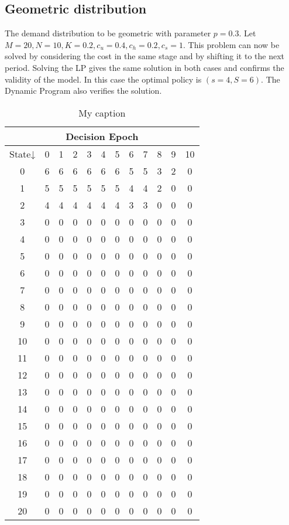 \documentclass[11pt,a4paper,oneside]{report}
\begin{document}
\subsection{Geometric distribution}
The demand distribution to be geometric with parameter $p=0.3$. Let $M = 20, N = 10, K=0.2, c_u=0.4, c_h=0.2, c_s=1$. This problem can now be solved by considering the cost in the same stage and by shifting it to the next period. Solving the LP gives the same solution in both cases and confirms the validity of the model. In this case the optimal policy is $(s=4, S=6)$. The Dynamic Program also verifies the solution.
\begin{table}[H]
\centering
\caption{My caption}
\label{my-label}
\begin{tabular}{|c|c|c|c|c|c|c|c|c|c|c|c|}
\hline
\multicolumn{12}{|c|}{Decision Epoch}               \\ \hline
State↓ & 0 & 1 & 2 & 3 & 4 & 5 & 6 & 7 & 8 & 9 & 10 \\ \hline
0      & 6 & 6 & 6 & 6 & 6 & 6 & 5 & 5 & 3 & 2 & 0  \\ \hline
1      & 5 & 5 & 5 & 5 & 5 & 5 & 4 & 4 & 2 & 0 & 0  \\ \hline
2      & 4 & 4 & 4 & 4 & 4 & 4 & 3 & 3 & 0 & 0 & 0  \\ \hline
3      & 0 & 0 & 0 & 0 & 0 & 0 & 0 & 0 & 0 & 0 & 0  \\ \hline
4      & 0 & 0 & 0 & 0 & 0 & 0 & 0 & 0 & 0 & 0 & 0  \\ \hline
5      & 0 & 0 & 0 & 0 & 0 & 0 & 0 & 0 & 0 & 0 & 0  \\ \hline
6      & 0 & 0 & 0 & 0 & 0 & 0 & 0 & 0 & 0 & 0 & 0  \\ \hline
7      & 0 & 0 & 0 & 0 & 0 & 0 & 0 & 0 & 0 & 0 & 0  \\ \hline
8      & 0 & 0 & 0 & 0 & 0 & 0 & 0 & 0 & 0 & 0 & 0  \\ \hline
9      & 0 & 0 & 0 & 0 & 0 & 0 & 0 & 0 & 0 & 0 & 0  \\ \hline
10     & 0 & 0 & 0 & 0 & 0 & 0 & 0 & 0 & 0 & 0 & 0  \\ \hline
11     & 0 & 0 & 0 & 0 & 0 & 0 & 0 & 0 & 0 & 0 & 0  \\ \hline
12     & 0 & 0 & 0 & 0 & 0 & 0 & 0 & 0 & 0 & 0 & 0  \\ \hline
13     & 0 & 0 & 0 & 0 & 0 & 0 & 0 & 0 & 0 & 0 & 0  \\ \hline
14     & 0 & 0 & 0 & 0 & 0 & 0 & 0 & 0 & 0 & 0 & 0  \\ \hline
15     & 0 & 0 & 0 & 0 & 0 & 0 & 0 & 0 & 0 & 0 & 0  \\ \hline
16     & 0 & 0 & 0 & 0 & 0 & 0 & 0 & 0 & 0 & 0 & 0  \\ \hline
17     & 0 & 0 & 0 & 0 & 0 & 0 & 0 & 0 & 0 & 0 & 0  \\ \hline
18     & 0 & 0 & 0 & 0 & 0 & 0 & 0 & 0 & 0 & 0 & 0  \\ \hline
19     & 0 & 0 & 0 & 0 & 0 & 0 & 0 & 0 & 0 & 0 & 0  \\ \hline
20     & 0 & 0 & 0 & 0 & 0 & 0 & 0 & 0 & 0 & 0 & 0  \\ \hline
\end{tabular}
\end{table}
\end{document}

